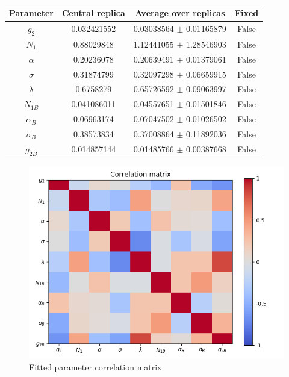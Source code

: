 \documentclass[
]{article}
\begin{document}
\begin{table}[h]

\centering

\begin{tabular}{|c|c|c|c|} \hline

\textbf{Parameter} & \textbf{Central replica} & \textbf{Average over
replicas} & \textbf{Fixed} \\ \hline

\(g_2\) & 0.032421552 & 0.03038564 \(\pm\) 0.01165879 & False \\ \hline
\(N_1\) & 0.88029848 & 1.12441055 \(\pm\) 1.28546903 & False \\ \hline
\(\alpha\) & 0.20236078 & 0.20639491 \(\pm\)
0.01379061 & False \\ \hline
\(\sigma\) & 0.31874799 & 0.32097298 \(\pm\)
0.06659915 & False \\ \hline
\(\lambda\) & 0.6758279 & 0.65726592 \(\pm\)
0.09063997 & False \\ \hline
\(N_{1B}\) & 0.041086011 & 0.04557651 \(\pm\)
0.01501846 & False \\ \hline
\(\alpha_B\) & 0.06963174 & 0.07047502 \(\pm\)
0.01026502 & False \\ \hline
\(\sigma_B\) & 0.38573834 & 0.37008864 \(\pm\)
0.11892036 & False \\ \hline
\(g_{2B}\) & 0.014857144 & 0.01485766 \(\pm\)
0.00387668 & False \\ \hline

\end{tabular}

\caption{}

\end{table}

\begin{figure}
\centering
\includegraphics{pngplots/CorrelationMatrix.png}
\caption{Fitted parameter correlation matrix}
\end{figure}
\end{document}
